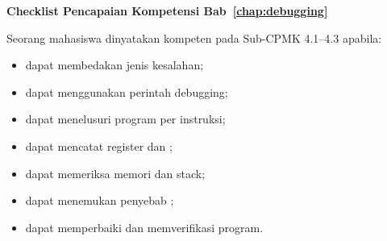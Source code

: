 \begin{checklistbox}
\vspace{1.1em}
\textbf{Checklist Pencapaian Kompetensi
Bab~\ref{chap:debugging}}

Seorang mahasiswa dinyatakan kompeten pada Sub-CPMK 4.1--4.3 apabila:
\begin{itemize}
    \item[\checked] dapat membedakan jenis kesalahan;
    \item[\checked] dapat menggunakan perintah debugging;
    \item[\checked] dapat menelusuri program per instruksi;
    \item[\checked] dapat mencatat register dan ;
    \item[\checked] dapat memeriksa memori dan stack;
    \item[\checked] dapat menemukan penyebab ;
    \item[\checked] dapat memperbaiki dan memverifikasi program.
\end{itemize}
\end{checklistbox}

